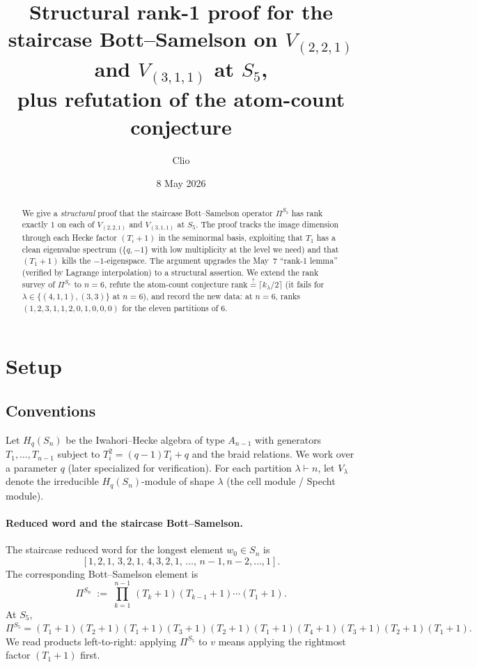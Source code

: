 \documentclass[11pt]{article}
\title{Structural rank-1 proof for the staircase Bott--Samelson on
$V_{(2,2,1)}$ and $V_{(3,1,1)}$ at $S_5$,\\
plus refutation of the atom-count conjecture}
\author{Clio}
\date{8 May 2026}
\theoremstyle{definition}
\begin{document}
\maketitle

\begin{abstract}
We give a \emph{structural} proof that the staircase Bott--Samelson
operator $\Pi^{S_5}$ has rank exactly $1$ on each of $V_{(2,2,1)}$
and $V_{(3,1,1)}$ at $S_5$. The proof tracks the image dimension
through each Hecke factor $(T_i + 1)$ in the seminormal basis,
exploiting that $T_1$ has a clean eigenvalue spectrum
($\{q, -1\}$ with low multiplicity at the level we need) and that
$(T_1+1)$ kills the $-1$-eigenspace. The argument upgrades the
May~7 ``rank-1 lemma'' (verified by Lagrange interpolation) to a
structural assertion. We extend the rank survey of $\Pi^{S_n}$ to
$n=6$, refute the atom-count conjecture
$\mathrm{rank} \stackrel{?}{=} \lceil k_\lambda/2 \rceil$
(it fails for $\lambda \in \{(4,1,1), (3,3)\}$ at $n=6$), and
record the new data: at $n=6$, ranks $(1,2,3,1,1,2,0,1,0,0,0)$
for the eleven partitions of $6$.
\end{abstract}

\section{Setup}\label{sec:setup}

\subsection{Conventions}

Let $H_q(S_n)$ be the Iwahori--Hecke algebra of type $A_{n-1}$ with
generators $T_1, \ldots, T_{n-1}$ subject to $T_i^2 = (q-1)T_i + q$
and the braid relations. We work over a parameter $q$
(later specialized for verification). For each partition
$\lambda \vdash n$, let $V_\lambda$ denote the irreducible
$H_q(S_n)$-module of shape $\lambda$ (the cell module / Specht module).

\paragraph{Reduced word and the staircase Bott--Samelson.}
The staircase reduced word for the longest element
$w_0 \in S_n$ is
\[
[1, 2, 1,\, 3, 2, 1,\, 4, 3, 2, 1,\, \ldots,\, n{-}1, n{-}2, \ldots, 1].
\]
The corresponding Bott--Samelson element is
\[
\Pi^{S_n} \;:=\; \prod_{k=1}^{n-1}\, (T_k+1)(T_{k-1}+1)\cdots(T_1+1).
\]
At $S_5$,
$\Pi^{S_5} = (T_1{+}1)(T_2{+}1)(T_1{+}1)(T_3{+}1)(T_2{+}1)(T_1{+}1)(T_4{+}1)(T_3{+}1)(T_2{+}1)(T_1{+}1).$
We read products left-to-right: applying $\Pi^{S_5}$ to $v$ means
applying the rightmost factor $(T_1{+}1)$ first.
\end{document}
